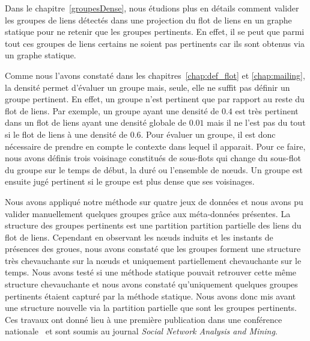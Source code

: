 \bigskip
Dans le chapitre~\ref{groupesDense}, nous étudions plus en détails comment valider les groupes de liens détectés dans une projection du flot de liens en un graphe statique pour ne retenir que les groupes pertinents.
En effet, il se peut que parmi tout ces groupes de liens certains ne soient pas pertinents car ils sont obtenus via un graphe statique.

Comme nous l'avons constaté dans les chapitres~\ref{chap:def_flot} et \ref{chap:mailing}, la densité permet d'évaluer un groupe mais, seule, elle ne suffit pas définir un groupe pertinent.
En effet, un groupe n'est pertinent que par rapport au reste du flot de liens.
Par exemple, un groupe ayant une densité de $0.4$ est très pertinent dans un flot de liens ayant une densité globale de $0.01$ mais il ne l'est pas du tout si le flot de liens à une densité de $0.6$.
Pour évaluer un groupe, il est donc nécessaire de prendre en compte le contexte dans lequel il apparait.
Pour ce faire, nous avons définis trois voisinage constitués de sous-flots qui change du sous-flot du groupe sur le temps de début, la duré ou l'ensemble de n\oe uds.
Un groupe est ensuite jugé pertinent si le groupe est plus dense que ses voisinages.

Nous avons appliqué notre méthode sur quatre jeux de données et nous avons pu valider manuellement quelques groupes grâce aux méta-données présentes.
La structure des groupes pertinents est une partition partition partielle des liens du flot de liens.
Cependant en observant les n\oe uds induits et les instants de présences des groues, nous avons constaté que les groupes forment une structure très chevauchante sur la n\oe uds et uniquement partiellement chevauchante sur le temps.
Nous avons testé si une méthode statique pouvait retrouver cette même structure chevauchante et nous avons constaté qu'uniquement quelques groupes pertinents étaient capturé par la méthode statique.
Nous avons donc mis avant une structure nouvelle via la partition partielle que sont les groupes pertinents.
Ces travaux ont donné lieu à une première publication dans une conférence nationale~\cite{Gaumont2016} et sont soumis au journal \emph{Social Network Analysis and Mining}.


\bigskip

